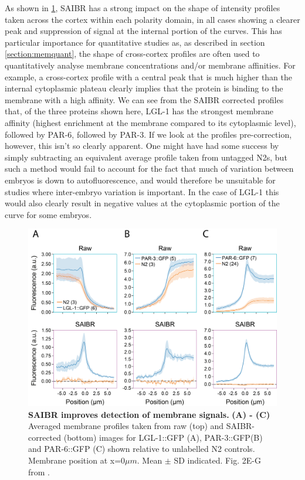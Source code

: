 \documentclass[12pt]{"article"}
\newcommand{\mycaption}[2]{\caption[#1]{\textbf{#1.} #2}}
\begin{document}
As shown in \cref{fig:saibr_membrane_profiles}, SAIBR has a strong impact on the shape of intensity profiles taken across the cortex within each polarity domain, in all cases showing a clearer peak and suppression of signal at the internal portion of the curves. This has particular importance for quantitative studies as, as described in section \ref{section:memquant}, the shape of cross-cortex profiles are often used to quantitatively analyse membrane concentrations and/or membrane affinities. For example, a cross-cortex profile with a central peak that is much higher than the internal cytoplasmic plateau clearly implies that the protein is binding to the membrane with a high affinity. We can see from the SAIBR corrected profiles that, of the three proteins shown here, LGL-1 has the strongest membrane affinity (highest enrichment at the membrane compared to its cytoplasmic level), followed by PAR-6, followed by PAR-3. If we look at the profiles pre-correction, however, this isn't so clearly apparent. One might have had some success by simply subtracting an equivalent average profile taken from untagged N2s, but such a method would fail to account for the fact that much of variation between embryos is down to autofluorescence, and would therefore be unsuitable for studies where inter-embryo variation is important. In the case of LGL-1 this would also clearly result in negative values at the cytoplasmic portion of the curve for some embryos.\\

\begin{figure}
\includegraphics[scale=1]{saibr_membrane_profiles}
\centering
\mycaption{SAIBR improves detection of membrane signals}{
\textbf{(A) - (C)} Averaged membrane profiles taken from raw (top) and SAIBR-corrected (bottom) images for LGL-1::GFP (A), PAR-3::GFP(B) and PAR-6::GFP (C) shown relative to unlabelled N2 controls. Membrane position at x=0$\mu m$. Mean $\pm$ SD indicated.
Fig. 2E-G from \textcite{Rodrigues2022}.}
\label{fig:saibr_membrane_profiles}
\end{figure}
\end{document}
